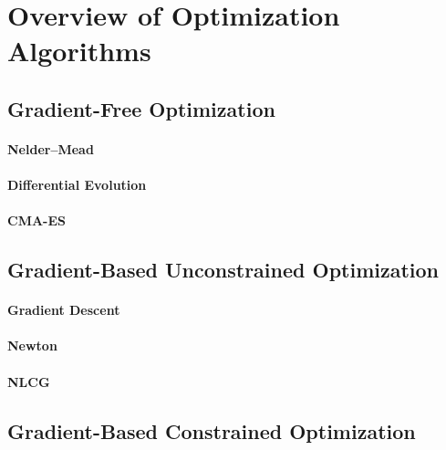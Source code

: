 \section{Overview of Optimization Algorithms}
\label{sec:51algorithms}

\blindtext{}

\subsection{Gradient-Free Optimization}
\label{sec:511gradientFree}

\blindtext{}

\paragraph{Nelder--Mead}

\blindtext{}

\paragraph{Differential Evolution}

\blindtext{}

\paragraph{CMA-ES}

\blindtext{}

\subsection{Gradient-Based Unconstrained Optimization}
\label{sec:512gradientBasedUnconstrained}

\blindtext{}

\paragraph{Gradient Descent}

\blindtext{}

\paragraph{Newton}

\blindtext{}

\paragraph{NLCG}

\blindtext{}

\subsection{Gradient-Based Constrained Optimization}
\label{sec:513gradientBasedConstrained}

\blindtext{}
